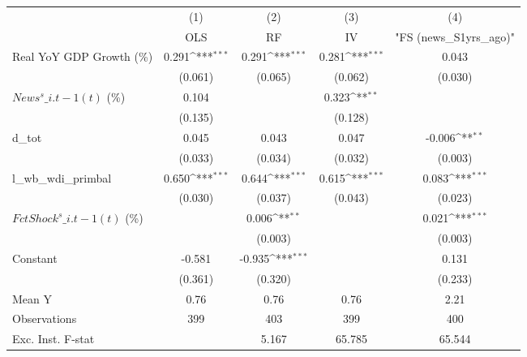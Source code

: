{
\def\sym#1{\ifmmode^{#1}\else\(^{#1}\)\fi}
\begin{tabular}{l*{4}{c}}
\toprule
                    &\multicolumn{1}{c}{(1)}&\multicolumn{1}{c}{(2)}&\multicolumn{1}{c}{(3)}&\multicolumn{1}{c}{(4)}\\
                    &\multicolumn{1}{c}{OLS}&\multicolumn{1}{c}{RF}&\multicolumn{1}{c}{IV}&\multicolumn{1}{c}{ "FS (news\_S1yrs\_ago)" }\\
\midrule
Real YoY GDP Growth (\%)&       0.291\sym{***}&       0.291\sym{***}&       0.281\sym{***}&       0.043         \\
                    &     (0.061)         &     (0.065)         &     (0.062)         &     (0.030)         \\
\addlinespace
$ News^s\_{i.t-1}(t)$ (\%)&       0.104         &                     &       0.323\sym{**} &                     \\
                    &     (0.135)         &                     &     (0.128)         &                     \\
\addlinespace
d\_tot               &       0.045         &       0.043         &       0.047         &      -0.006\sym{**} \\
                    &     (0.033)         &     (0.034)         &     (0.032)         &     (0.003)         \\
\addlinespace
l\_wb\_wdi\_primbal    &       0.650\sym{***}&       0.644\sym{***}&       0.615\sym{***}&       0.083\sym{***}\\
                    &     (0.030)         &     (0.037)         &     (0.043)         &     (0.023)         \\
\addlinespace
$ FctShock^s\_{i.t-1}(t)$ (\%)&                     &       0.006\sym{**} &                     &       0.021\sym{***}\\
                    &                     &     (0.003)         &                     &     (0.003)         \\
\addlinespace
Constant            &      -0.581         &      -0.935\sym{***}&                     &       0.131         \\
                    &     (0.361)         &     (0.320)         &                     &     (0.233)         \\
\midrule
Mean Y              &        0.76         &        0.76         &        0.76         &        2.21         \\
Observations        &         399         &         403         &         399         &         400         \\
Exc. Inst. F-stat   &                     &       5.167         &      65.785         &      65.544         \\
\bottomrule
\end{tabular}
}
